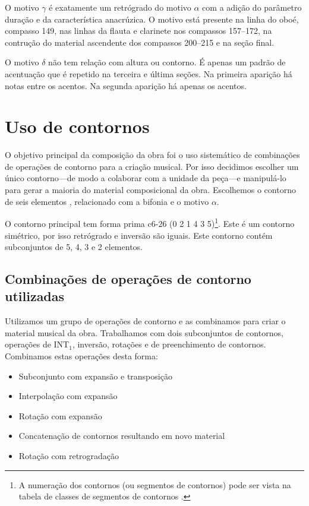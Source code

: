 O motivo $\gamma$ é exatamente um retrógrado do motivo $\alpha$ com a
adição do parâmetro duração e da característica anacrúzica. O motivo
está presente na linha do oboé, compasso 149, nas linhas da flauta e
clarinete nos compassos 157--172, na contrução do material ascendente
dos compassos 200--215 e na seção final.

O motivo $\delta$ não tem relação com altura ou contorno. É apenas um
padrão de acentuação que é repetido na terceira e última seções. Na
primeira aparição há notas  entre os acentos. Na segunda
aparição há apenas os acentos.

\section{Uso de contornos}
\label{sec:uso-de-contornos}

O objetivo principal da composição da obra \obra{} foi o uso
sistemático de combinações de operações de contorno para a criação
musical. Por isso decidimos escolher um único contorno---de modo a
colaborar com a unidade da peça---e manipulá-lo para gerar a maioria
do material composicional da obra. Escolhemos o contorno de seis
elementos \contpr{}, relacionado com a bifonia e o motivo $\alpha$.

O contorno principal \contpr{} tem forma prima c6-26 (0 2 1 4 3
5)\footnote{A numeração dos contornos (ou segmentos de contornos) pode
  ser vista na tabela de classes de segmentos de contornos
  \cite{marvin.ea87:relating}.}. Este é um contorno simétrico, por
isso retrógrado e inversão são iguais. Este contorno contém
subconjuntos de 5, 4, 3 e 2 elementos.

\subsection{Combinações de operações de contorno utilizadas}
\label{sec:comb-de-oper}

Utilizamos um grupo de operações de contorno e as combinamos para
criar o material musical da obra. Trabalhamos com dois subconjuntos de
contornos, operações de INT$_1$, inversão, rotações e de preenchimento
de contornos. Combinamos estas operações desta forma:

\begin{itemize}
\item Subconjunto com expansão e transposição
\item Interpolação com expansão
\item Rotação com expansão
\item Concatenação de contornos resultando em novo material
\item Rotação com retrogradação
\end{itemize}

